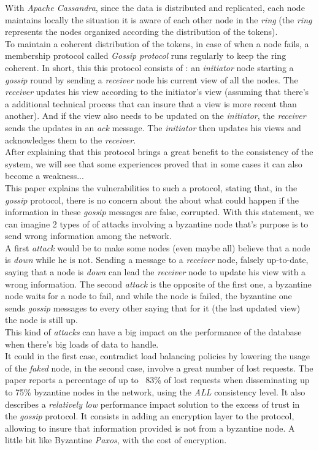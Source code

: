 \documentclass[a4paper]{report}
\newcommand{\ca}{\emph{Apache Cassandra\xspace}}
\newcommand{\px}{\emph{Paxos\xspace}}
\begin{document}
With \ca{}, since the data is distributed and replicated, each node maintains locally the situation it is aware of each other node in the \emph{ring} (the \emph{ring} represents the nodes organized according the distribution of the tokens). \\
To maintain a coherent distribution of the tokens, in case of when a node fails, a membership protocol called \emph{Gossip protocol} runs regularly to keep the ring coherent. In short, this this protocol consists of : an \emph{initiator} node starting a \emph{gossip} round by sending a \emph{receiver} node his current view of all the nodes. The \emph{receiver} updates his view according to the initiator's view (assuming that there's a additional technical process that can insure that a view is more recent than another). And if the view also needs to be updated on the \emph{initiator}, the \emph{receiver} sends the updates in an \emph{ack} message. The \emph{initiator} then updates his views and acknowledges them to the \emph{receiver}.\\
After explaining that this protocol brings a great benefit to the consistency of the system, we will see that some experiences proved that in some cases it can also become a weakness...\\
This\cite{Aniello13} paper explains the vulnerabilities to such a protocol, stating that, in the \emph{gossip} protocol, there is no concern about the about what could happen if the information in these \emph{gossip} messages are false, corrupted. With this statement, we can imagine 2 types of of attacks involving a byzantine node that's purpose is to send wrong information among the network.\\
A first \emph{attack} would be to make some nodes (even maybe all) believe that a node is \emph{down} while he is not. Sending a message to a \emph{receiver} node, falsely up-to-date, saying that a node is \emph{down} can lead the \emph{receiver} node to update his view with a wrong information. The second \emph{attack} is the opposite of the first one, a byzantine node waits for a node to fail, and while the node is failed, the byzantine one sends \emph{gossip} messages to every other saying that for it (the last updated view) the node is still up.\\
This kind of \emph{attacks} can have a big impact on the performance of the database when there's big loads of data to handle. \\
It could in the first case, contradict load balancing policies by lowering the usage of the \emph{faked} node, in the second case, involve a great number of lost requests. The paper reports a percentage of up to ~83\% of lost requests when disseminating up to 75\% byzantine nodes in the network, using the \emph{ALL} consistency level. It also describes a \emph{relatively low} performance impact solution to the excess of trust in the \emph{gossip} protocol. It consists in adding an encryption layer to the protocol, allowing to insure that information provided is not from a byzantine node. A little bit like Byzantine \px{}\cite{Martin}, with the cost of encryption.
\end{document}
